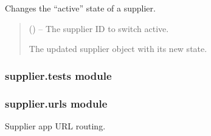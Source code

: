 \documentclass[a4paper,11pt,spanish]{sphinxmanual}
\begin{document}

\begin{fulllineitems}
\label{\detokenize{api/supplier/supplier.services:supplier.services.toggle_supplier_active}}
\pysigstartsignatures
\pysiglinewithargsret
{}
{}
{}
\pysigstopsignatures
\sphinxAtStartPar
Changes the “active” state of a supplier.
\begin{quote}\begin{description}
\sphinxAtStartPar
{} () – The supplier ID to switch active.

\sphinxAtStartPar
The updated supplier object with its new state.

\sphinxAtStartPar
{\hyperref[\detokenize{api/supplier/supplier.models:supplier.models.Supplier}]{}}

\end{description}\end{quote}

\end{fulllineitems}


\sphinxstepscope


\subsubsection{supplier.tests module}
\label{\detokenize{api/supplier/supplier.tests:module-supplier.tests}}\label{\detokenize{api/supplier/supplier.tests:supplier-tests-module}}\label{\detokenize{api/supplier/supplier.tests::doc}}
\sphinxstepscope


\subsubsection{supplier.urls module}
\label{\detokenize{api/supplier/supplier.urls:module-supplier.urls}}\label{\detokenize{api/supplier/supplier.urls:supplier-urls-module}}\label{\detokenize{api/supplier/supplier.urls::doc}}
\sphinxAtStartPar
Supplier app URL routing.
\end{document}
